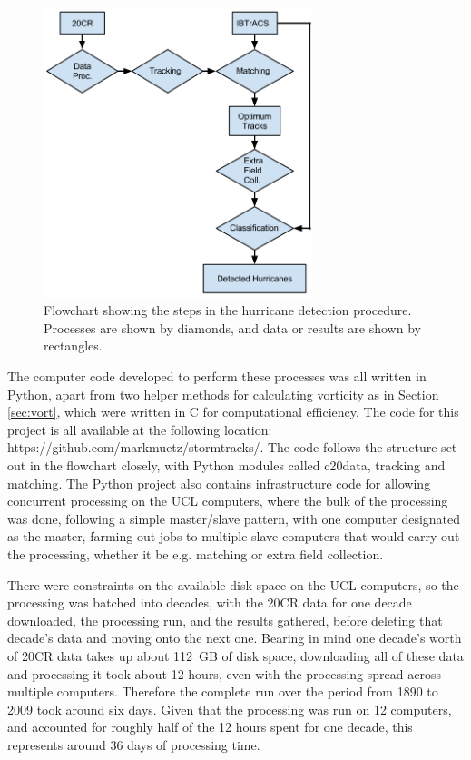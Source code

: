 \documentclass[pdftex,12pt,a4paper]{report}
\begin{document}
\begin{figure}[ht!]
    \centering
    \includegraphics[width=0.7\textwidth]{figures/hurricane_detection_procedure}
    \caption{Flowchart showing the steps in the hurricane detection procedure. Processes are shown
    by diamonds, and data or results are shown by rectangles. }
    \label{fig:hurricane_detection_proc}
\end{figure}

\newpage
The computer code developed to perform these processes was all written in Python, apart from two
helper methods for calculating vorticity as in Section \ref{sec:vort}, which were written in C for
computational efficiency. The code for this project is all available at the following location:
https://github.com/markmuetz/stormtracks/. The code follows the structure set out in the flowchart
closely, with Python modules called c20data, tracking and matching. The Python project also contains
infrastructure code for allowing concurrent processing on the UCL computers, where the bulk of the
processing was done, following a simple master/slave pattern, with one computer designated as the
master, farming out jobs to multiple slave computers that would carry out the processing, whether it
be e.g. matching or extra field collection. 

There were constraints on the available disk space on the UCL computers, so the processing was
batched into decades, with the 20CR data for one decade downloaded, the processing run, and the
results gathered, before deleting that decade's data and moving onto the next one.  Bearing in mind
one decade's worth of 20CR data takes up about \SI{112}{GB} of disk space, downloading all of these
data and processing it took about 12 hours, even with the processing spread across multiple
computers. Therefore the complete run over the period from 1890 to 2009 took around six days. Given
that the processing was run on 12 computers, and accounted for roughly half of the 12 hours spent
for one decade, this represents around 36 days of processing time.
\end{document}
